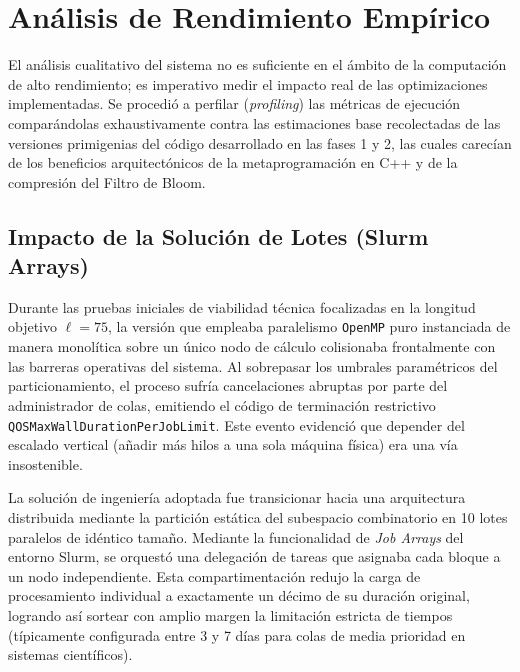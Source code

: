 \documentclass[12pt,a4paper]{tfg_domingo}
\begin{document}
\section{Análisis de Rendimiento Empírico}

El análisis cualitativo del sistema no es suficiente en el ámbito de
la computación de alto rendimiento; es imperativo medir el impacto
real de las optimizaciones implementadas. Se procedió a perfilar
(\emph{profiling}) las métricas de ejecución comparándolas
exhaustivamente contra las estimaciones base recolectadas de las
versiones primigenias del código desarrollado en las fases 1 y 2, las
cuales carecían de los beneficios arquitectónicos de la
metaprogramación en C++ y de la compresión del Filtro de Bloom. 

\subsection{Impacto de la Solución de Lotes (Slurm Arrays)}

Durante las pruebas iniciales de viabilidad técnica focalizadas en la
longitud objetivo $\ell=75$, la versión que empleaba paralelismo
\texttt{OpenMP} puro instanciada de manera monolítica sobre un único
nodo de cálculo colisionaba frontalmente con las barreras operativas
del sistema. Al sobrepasar los umbrales paramétricos del
particionamiento, el proceso sufría cancelaciones abruptas por parte
del administrador de colas, emitiendo el código de terminación
restrictivo \texttt{QOSMaxWallDurationPerJobLimit}. Este evento
evidenció que depender del escalado vertical (añadir más hilos a una
sola máquina física) era una vía insostenible. 

La solución de ingeniería adoptada fue transicionar hacia una
arquitectura distribuida mediante la partición estática del subespacio
combinatorio en 10 lotes paralelos de idéntico tamaño. Mediante la
funcionalidad de \emph{Job Arrays} del entorno Slurm, se orquestó una
delegación de tareas que asignaba cada bloque a un nodo
independiente. Esta compartimentación redujo la carga de procesamiento
individual a exactamente un décimo de su duración original, logrando
así sortear con amplio margen la limitación estricta de tiempos
(típicamente configurada entre 3 y 7 días para colas de media
prioridad en sistemas científicos). 
\end{document}
